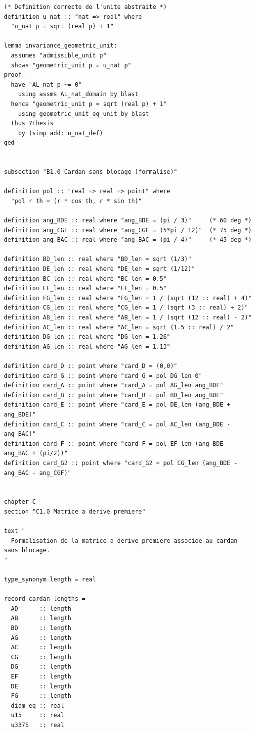 \documentclass[12pt,a4paper]{article}
\begin{document}
\begin{verbatim}
(* Definition correcte de l'unite abstraite *)
definition u_nat :: "nat => real" where
  "u_nat p = sqrt (real p) + 1"

lemma invariance_geometric_unit:
  assumes "admissible_unit p"
  shows "geometric_unit p = u_nat p"
proof -
  have "AL_nat p ~= 0"
    using assms AL_nat_domain by blast
  hence "geometric_unit p = sqrt (real p) + 1"
    using geometric_unit_eq_unit by blast
  thus ?thesis
    by (simp add: u_nat_def)
qed


subsection "B1.0 Cardan sans blocage (formalise)"

definition pol :: "real => real => point" where
  "pol r th = (r * cos th, r * sin th)"

definition ang_BDE :: real where "ang_BDE = (pi / 3)"     (* 60 deg *)
definition ang_CGF :: real where "ang_CGF = (5*pi / 12)"  (* 75 deg *)
definition ang_BAC :: real where "ang_BAC = (pi / 4)"     (* 45 deg *)

definition BD_len :: real where "BD_len = sqrt (1/3)"
definition DE_len :: real where "DE_len = sqrt (1/12)"
definition BC_len :: real where "BC_len = 0.5"
definition EF_len :: real where "EF_len = 0.5"
definition FG_len :: real where "FG_len = 1 / (sqrt (12 :: real) + 4)"
definition CG_len :: real where "CG_len = 1 / (sqrt (3 :: real) + 2)"
definition AB_len :: real where "AB_len = 1 / (sqrt (12 :: real) - 2)"
definition AC_len :: real where "AC_len = sqrt (1.5 :: real) / 2"
definition DG_len :: real where "DG_len = 1.26"
definition AG_len :: real where "AG_len = 1.13"

definition card_D :: point where "card_D = (0,0)"
definition card_G :: point where "card_G = pol DG_len 0"
definition card_A :: point where "card_A = pol AG_len ang_BDE"
definition card_B :: point where "card_B = pol BD_len ang_BDE"
definition card_E :: point where "card_E = pol DE_len (ang_BDE + ang_BDE)"
definition card_C :: point where "card_C = pol AC_len (ang_BDE - ang_BAC)"
definition card_F :: point where "card_F = pol EF_len (ang_BDE - ang_BAC + (pi/2))"
definition card_G2 :: point where "card_G2 = pol CG_len (ang_BDE - ang_BAC - ang_CGF)"


chapter C
section "C1.0 Matrice a derive premiere"

text "
  Formalisation de la matrice a derive premiere associee au cardan sans blocage.
"

type_synonym length = real

record cardan_lengths =
  AD      :: length
  AB      :: length
  BD      :: length
  AG      :: length
  AC      :: length
  CG      :: length
  DG      :: length
  EF      :: length
  DE      :: length
  FG      :: length
  diam_eq :: real
  u15     :: real
  u3375   :: real


\end{verbatim}
\end{document}
